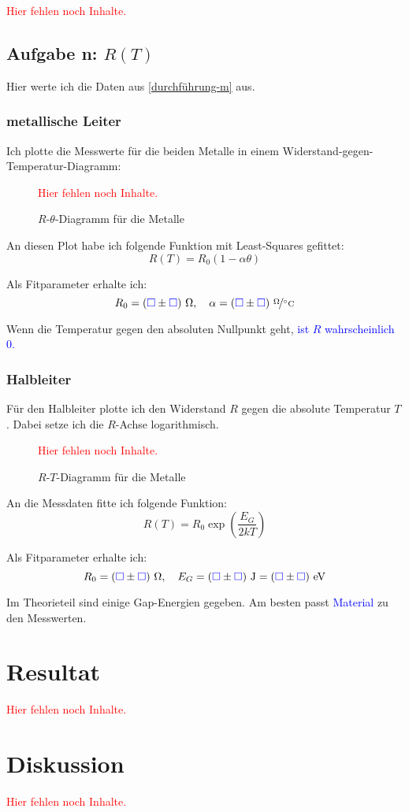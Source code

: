 \documentclass[11pt,german]{article}
\newcommand{\messwert}{\textcolor{blue}{\square}}
\newcommand{\emesswert}{\left(\messwert \pm \messwert \right)}
\newcommand{\fehlt}{\textcolor{red}{Hier fehlen noch Inhalte.}}
\begin{document}
\fehlt

\subsection{Aufgabe n: $R(T)$}

Hier werte ich die Daten aus \ref{durchführung-m} aus.

\subsubsection{metallische Leiter}

Ich plotte die Messwerte für die beiden Metalle in einem Widerstand-gegen-Temperatur-Diagramm:

\begin{figure}[h!]
	\centering
	\fehlt
	\caption{$R$-$\theta$-Diagramm für die Metalle}
\end{figure}

An diesen Plot habe ich folgende Funktion mit Least-Squares gefittet:
\[ R(T) = R_0 \left( 1 - \alpha \theta \right) \]

Als Fitparameter erhalte ich:
\[
	R_0 = \unit[\emesswert] \Omega,
	\quad
	\alpha = \unitfrac[\emesswert]\Omega{^\circ C}
\]

Wenn die Temperatur gegen den absoluten Nullpunkt geht, \textcolor{blue}{ist $R$ wahrscheinlich 0.}

\subsubsection{Halbleiter}

Für den Halbleiter plotte ich den Widerstand $R$ gegen die absolute Temperatur $T$. Dabei setze ich die $R$-Achse logarithmisch.

\begin{figure}[h!]
	\centering
	\fehlt
	\caption{$R$-$T$-Diagramm für die Metalle}
\end{figure}

An die Messdaten fitte ich folgende Funktion:
\[ R(T) = R_0 \exp \left( \frac{E_G}{2 k T} \right) \]

Als Fitparameter erhalte ich:
\[
	R_0 = \unit[\emesswert] \Omega,
	\quad
	E_G = \unit[\emesswert] J = \unit[\emesswert]{eV}
\]

Im Theorieteil sind einige Gap-Energien gegeben. Am besten passt \textcolor{blue}{Material} zu den Messwerten.


\section{Resultat}

\fehlt


\section{Diskussion}

\fehlt
\end{document}
